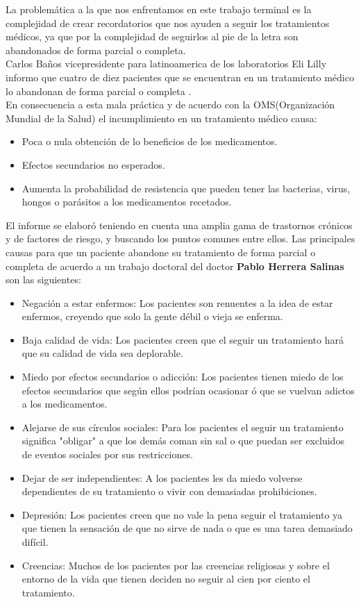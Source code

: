 La problemática a la que nos enfrentamos en este trabajo terminal es la complejidad de crear recordatorios que nos ayuden a seguir los tratamientos médicos, ya que por la complejidad de seguirlos al pie de la letra son abandonados de forma parcial o completa.\\
Carlos Baños vicepresidente para latinoamerica de los laboratorios Eli Lilly informo que cuatro de diez pacientes que se encuentran en un tratamiento médico lo abandonan de forma parcial o completa \cite{Referencia1}.\\
En consecuencia a esta mala práctica y de acuerdo con la OMS(Organización Mundial de la Salud)\cite{Referencia2} el incumplimiento en un tratamiento médico causa:
\begin{itemize}
	\item Poca o nula obtención de lo beneficios de los medicamentos.
	\item Efectos secundarios no esperados.
	\item Aumenta la probabilidad de resistencia que pueden tener las bacterias, virus, hongos o parásitos a los medicamentos recetados.
\end{itemize}
El informe se elaboró teniendo en cuenta una amplia gama de trastornos crónicos y de factores de riesgo, y buscando los puntos comunes entre ellos\cite{Referencia3}.
Las principales causas para que un paciente abandone su tratamiento de forma parcial o completa de acuerdo a un trabajo doctoral del doctor \textbf{Pablo Herrera Salinas}\cite{Referencia4} son las siguientes:
\begin{itemize}
	\item Negación a estar enfermos: Los pacientes son renuentes a la idea de estar enfermos, creyendo que solo la gente débil o vieja se enferma.
	\item Baja calidad de vida: Los pacientes creen que el seguir un tratamiento hará que su calidad de vida sea deplorable.
	\item Miedo por efectos secundarios o adicción: Los pacientes tienen miedo de los efectos secundarios que según ellos podrían ocasionar ó que se vuelvan adictos a los medicamentos.
	\item Alejarse de sus círculos sociales: Para los pacientes el seguir un tratamiento significa "obligar" a que los demás coman sin sal o que puedan ser excluidos de eventos sociales por sus restricciones.
	\item Dejar de ser independientes: A los pacientes les da miedo volverse dependientes de su tratamiento o vivir con demasiadas prohibiciones.
	\item Depresión: Los pacientes creen que no vale la pena seguir el tratamiento ya que tienen la sensación de que no sirve de nada o que es una tarea demasiado difícil.
	\item Creencias: Muchos de los pacientes por las creencias religiosas y sobre el entorno de la vida que tienen deciden no seguir al cien por ciento el tratamiento.
\end{itemize}

